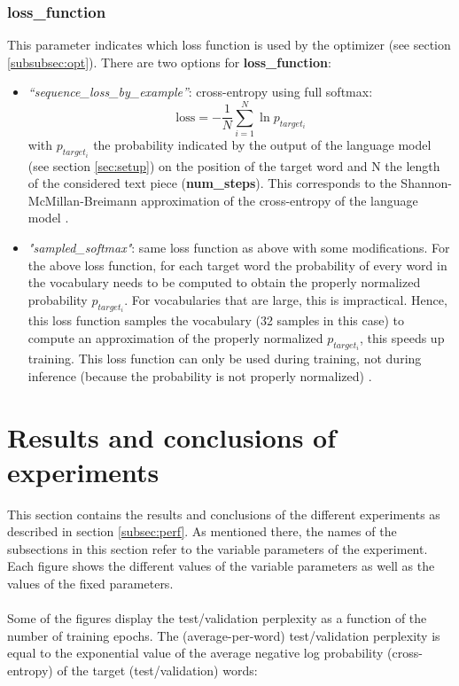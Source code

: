 \documentclass[10pt,a4paper,titlepage]{article}
\begin{document}
\subsubsection{loss\_function}
\label{subsubsec:loss}

This parameter indicates which loss function is used by the optimizer (see section \ref{subsubsec:opt}). There are two options for \textbf{loss\_function}:

\begin{itemize}
	
	\item \textit{``sequence\_loss\_by\_example''}: cross-entropy using full softmax:
	\[ \text{loss} = -\frac{1}{N} \sum_{i=1}^{N} \ln p_{target_{i}} \]
	\noindent
	with $p_{target_{i}}$ the probability indicated by the output of the language model (see section \ref{sec:setup}) on the position of the target word and N the length of the considered text piece (\textbf{num\_steps}). This corresponds to the Shannon-McMillan-Breimann approximation of the cross-entropy of the language model \cite{cross}.
	
	\item \textit{"sampled\_softmax"}: same loss function as above with some modifications. For the above loss function, for each target word the probability of every word in the vocabulary needs to be computed to obtain  the properly normalized probability $p_{target_{i}}$. For vocabularies that are large, this is impractical. Hence, this loss function samples the vocabulary (32 samples in this case) to compute an approximation of the properly normalized $p_{target_{i}}$, this speeds up training. This loss function can only be used during training, not during inference (because the probability is not properly normalized) \cite{sampled}.
	
\end{itemize}

\section{Results and conclusions of experiments}
\label{sec:results}

This section contains the results and conclusions of the different experiments as described in section \ref{subsec:perf}. As mentioned there, the names of the subsections in this section refer to the variable parameters of the experiment. Each figure shows the different values of the variable parameters as well as the values of the fixed parameters.\\
\\
Some of the figures display the test/validation perplexity as a function of the number of training epochs. The (average-per-word) test/validation perplexity is equal to the exponential value of the average negative log probability (cross-entropy) of the target (test/validation) words:
\end{document}
